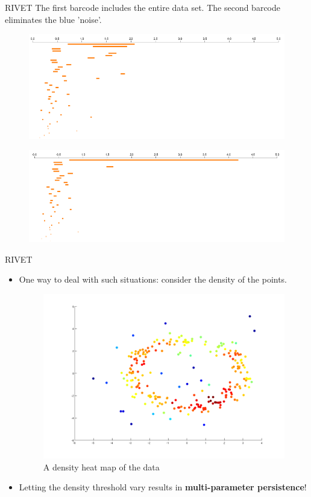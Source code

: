 \documentclass[usenames,dvipsnames,aspectratio=1610]{beamer}
\begin{document}
\begin{frame}{RIVET}
The first barcode includes the entire data set.  The second barcode eliminates the blue 'noise'.

\begin{figure}
\centering
\includegraphics[scale=0.35]{images/data7.png}
\end{figure} 

\begin{figure}
\centering
\includegraphics[scale=0.35]{images/data7nonoise.png}
\end{figure} 
\end{frame}


\begin{frame}{RIVET}
\begin{itemize}
\item<1-> One way to deal with such situations: consider the density of the points.
\begin{figure}
\includegraphics[scale=0.2]{images/data7density}
\caption{A density heat map of the data}
\end{figure} 
\item<2-> Letting the density threshold vary results in \textbf{multi-parameter persistence}!
\end{itemize}
\end{frame}
\end{document}
